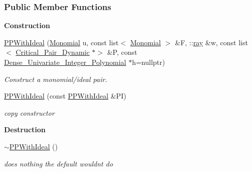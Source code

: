 \subsubsection*{Public Member Functions}
\begin{Indent}\textbf{ Construction}\par
\begin{DoxyCompactItemize}
\item 
\hyperlink{group___g_b_computation_a4aaab17f2c6c03dfe1b6cc6bb2ca3f73}{P\+P\+With\+Ideal} (\hyperlink{group__polygroup_class_monomial}{Monomial} u, const list$<$ \hyperlink{group__polygroup_class_monomial}{Monomial} $>$ \&F, \+::\hyperlink{group___c_l_s_solvers_classray}{ray} \&w, const list$<$ \hyperlink{group___g_b_computation_class_critical___pair___dynamic}{Critical\+\_\+\+Pair\+\_\+\+Dynamic} $\ast$$>$ \&P, const \hyperlink{group__polygroup_class_dense___univariate___integer___polynomial}{Dense\+\_\+\+Univariate\+\_\+\+Integer\+\_\+\+Polynomial} $\ast$h=nullptr)
\begin{DoxyCompactList}\small\item\em Construct a monomial/ideal pair. \end{DoxyCompactList}\item 
\mbox{\label{group___g_b_computation_aee52e551312d3380a5a25ed2e02c8d87}} 
\hyperlink{group___g_b_computation_aee52e551312d3380a5a25ed2e02c8d87}{P\+P\+With\+Ideal} (const \hyperlink{group___g_b_computation_class_p_p_with_ideal}{P\+P\+With\+Ideal} \&PI)
\begin{DoxyCompactList}\small\item\em copy constructor \end{DoxyCompactList}\end{DoxyCompactItemize}
\end{Indent}
\begin{Indent}\textbf{ Destruction}\par
\begin{DoxyCompactItemize}
\item 
\mbox{\label{group___g_b_computation_acea0ed75b266fc9abcf1fd0833493230}} 
\hyperlink{group___g_b_computation_acea0ed75b266fc9abcf1fd0833493230}{$\sim$\+P\+P\+With\+Ideal} ()
\begin{DoxyCompactList}\small\item\em does nothing the default wouldn\textquotesingle{}t do \end{DoxyCompactList}\end{DoxyCompactItemize}
\end{Indent}
